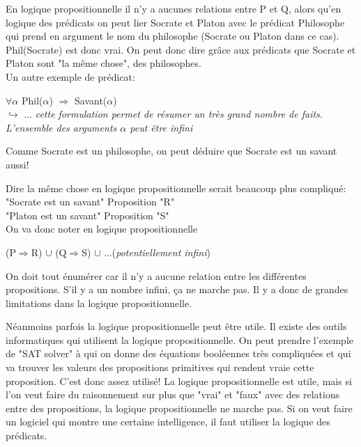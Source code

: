 En logique propositionnelle il n'y a aucunes relations entre P et Q, alors qu'en logique des prédicats on peut lier Socrate et Platon avec le prédicat Philosophe qui prend en argument le nom du philosophe (Socrate ou Platon dans ce cas). Phil(Socrate) est donc vrai. On peut donc dire grâce aux prédicats que Socrate et Platon sont "la même chose", des philosophes.\\

Un autre exemple de prédicat:

\begin{center}
$\forall \alpha$ Phil($\alpha$) $\Rightarrow$ Savant($\alpha$)\\
\vspace{3mm}
$\hookrightarrow$ ... \textit{cette formulation permet de résumer un très grand nombre de faits. L'ensemble des arguments $\alpha$ peut être infini}
\end{center}
Comme Socrate est un philosophe, on peut déduire que Socrate est un savant aussi!

Dire la même chose en logique propositionnelle serait beaucoup plus compliqué: \\

"Socrate est un savant" Proposition "R"\\
\indent "Platon est un savant" Proposition "S"\\

On va donc noter en logique propositionnelle
\begin{center}
(P$\Rightarrow$R) $\cup$ (Q$\Rightarrow$S) $\cup$ ...(\textit{potentiellement infini})
\end{center}

On doit tout énumérer car il n'y a aucune relation entre les différentes propositions. S'il y a un nombre infini, ça ne marche pas. Il y a donc de grandes limitations dans la logique propositionnelle.

Néanmoins parfois la logique propositionnelle peut être utile. 
Il existe des outils informatiques qui utilisent la logique propositionnelle. On peut prendre l'exemple de "SAT solver" à qui on donne des équations booléennes très compliquées et qui va trouver les valeurs des propositions primitives qui rendent vraie cette proposition. C'est donc assez utilisé! La logique propositionnelle est utile, mais si l'on veut faire du raisonnement sur plus que  "vrai" et "faux" avec des relations entre des propositions,  la logique propositionnelle ne marche pas. Si on veut faire un logiciel qui montre une certaine intelligence, il faut utiliser la logique des prédicats.\\

